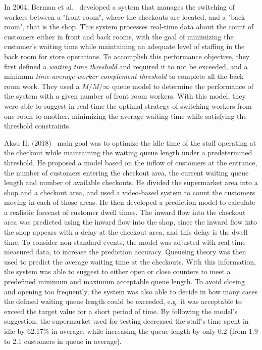 In 2004, Berman et al.~\cite{berman} developed a system that manages the switching of workers between a "front room", where the checkouts are located, and a "back room", that is the shop. This system processes real-time data about the count of customers either in front and back rooms, with the goal of minimizing the customer's waiting time while maintaining an adequate level of staffing in the back room for store operations. To accomplish this performance objective, they first defined a \emph{waiting time threshold} and required it to not be exceeded, and a minimum \emph{time-average worker complement threshold} to complete all the back room work. They used a \( M/M/\infty \) queue model to determine the performance of the system with a given number of front room workers. With this model, they were able to suggest in real-time the optimal strategy of switching workers from one room to another, minimizing the average waiting time while satisfying the threshold constraints.

Aksu H. (2018)~\cite{aksu} main goal was to optimize the idle time of the staff operating at the checkout while maintaining the waiting queue length under a predetermined threshold. He proposed a model based on the inflow of customers at the entrance, the number of customers entering the checkout area, the current waiting queue length and number of available checkouts. He divided the supermarket area into a shop and a checkout area, and used a video-based system to count the customers moving in each of those areas. He then developed a prediction model to calculate a realistic forecast of customer dwell times. The inward flow into the checkout area was predicted using the inward flow into the shop, since the inward flow into the shop appears with a delay at the checkout area, and this delay is the dwell time. To consider non-standard events, the model was adjusted with real-time measured data, to increase the prediction accuracy. Queueing theory was then used to predict the average waiting time at the checkouts. With this information, the system was able to suggest to either open or close counters to meet a predefined minimum and maximum acceptable queue length. To avoid closing and opening too frequently, the system was also able to decide in how many cases the defined waiting queue length could be exceeded, e.g. it was acceptable to exceed the target value for a short period of time. By following the model’s suggestion, the supermarket used for testing decreased the staff’s time spent in idle by 62.17\% in average, while increasing the queue length by only 0.2 (from 1.9 to 2.1 customers in queue in average).

